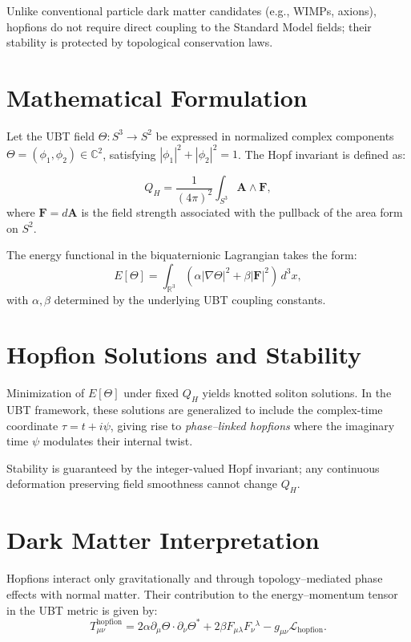 Unlike conventional particle dark matter candidates (e.g., WIMPs, axions), hopfions do not require direct coupling to the Standard Model fields; their stability is protected by topological conservation laws.

\section*{Mathematical Formulation}
Let the UBT field \(\Theta: S^3 \to S^2\) be expressed in normalized complex components \(\Theta = (\phi_1, \phi_2) \in \mathbb{C}^2\), satisfying \(|\phi_1|^2 + |\phi_2|^2 = 1\). The Hopf invariant is defined as:

\begin{equation}
Q_H = \frac{1}{(4\pi)^2} \int_{S^3} \mathbf{A} \wedge \mathbf{F},
\end{equation}
where \(\mathbf{F} = d\mathbf{A}\) is the field strength associated with the pullback of the area form on \(S^2\).

The energy functional in the biquaternionic Lagrangian takes the form:
\begin{equation}
E[\Theta] = \int_{\mathbb{R}^3} \left( \alpha |\nabla \Theta|^2 + \beta |\mathbf{F}|^2 \right) \, d^3x,
\end{equation}
with \(\alpha, \beta\) determined by the underlying UBT coupling constants.

\section*{Hopfion Solutions and Stability}
Minimization of \(E[\Theta]\) under fixed \(Q_H\) yields knotted soliton solutions. In the UBT framework, these solutions are generalized to include the complex-time coordinate \(\tau = t + i\psi\), giving rise to \emph{phase–linked hopfions} where the imaginary time \(\psi\) modulates their internal twist.

Stability is guaranteed by the integer-valued Hopf invariant; any continuous deformation preserving field smoothness cannot change \(Q_H\).

\section*{Dark Matter Interpretation}
Hopfions interact only gravitationally and through topology–mediated phase effects with normal matter. Their contribution to the energy–momentum tensor in the UBT metric is given by:
\begin{equation}
T_{\mu\nu}^{\text{hopfion}} = 2\alpha \partial_\mu \Theta \cdot \partial_\nu \Theta^* + 2\beta F_{\mu\lambda} F_{\nu}{}^\lambda - g_{\mu\nu} \mathcal{L}_{\text{hopfion}}.
\end{equation}

